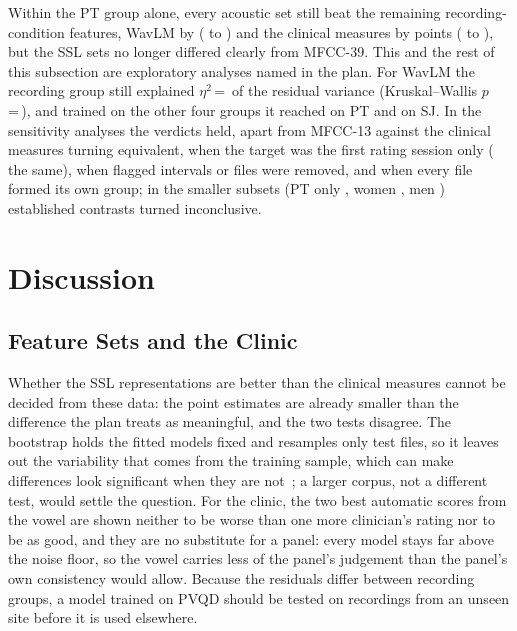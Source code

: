 \documentclass[journal]{IEEEtran}
\begin{document}
Within the PT group alone, every acoustic set still beat the remaining recording-condition features, WavLM by \ptAfiveDelta{} (\ptAfiveLow{} to \ptAfiveHigh{}) and the clinical measures by \ptAthreeDelta{} points (\ptAthreeLow{} to \ptAthreeHigh{}), but the SSL sets no longer differed clearly from MFCC-39. This and the rest of this subsection are exploratory analyses named in the plan. For WavLM the recording group still explained $\eta^2$\,=\,\residualAfiveEta{} of the residual variance (Kruskal--Wallis $p$\,=\,\residualAfiveP{}), and trained on the other four groups it reached \logoAfivePTRmse{} on PT and \logoAfiveSJRmse{} on SJ. In the sensitivity analyses the verdicts held, apart from MFCC-13 against the clinical measures turning equivalent, when the target was the first rating session only (\sensEfivedFirstSessionSame{} the same), when flagged intervals or files were removed, and when every file formed its own group; in the smaller subsets (PT only \sensEfiveaPtOnlySame{}, women \sensEfivecFemaleSame{}, men \sensEfivecMaleSame{}) established contrasts turned inconclusive.

\section{Discussion}\label{sec:discussion}

\subsection{Feature Sets and the Clinic}
Whether the SSL representations are better than the clinical measures cannot be decided from these data: the point estimates are already smaller than the difference the plan treats as meaningful, and the two tests disagree. The bootstrap holds the fitted models fixed and resamples only test files, so it leaves out the variability that comes from the training sample, which can make differences look significant when they are not~\cite{nadeau2003inference}; a larger corpus, not a different test, would settle the question. For the clinic, the two best automatic scores from the vowel are shown neither to be worse than one more clinician's rating nor to be as good, and they are no substitute for a panel: every model stays far above the noise floor, so the vowel carries less of the panel's judgement than the panel's own consistency would allow. Because the residuals differ between recording groups, a model trained on PVQD should be tested on recordings from an unseen site before it is used elsewhere.
\end{document}
